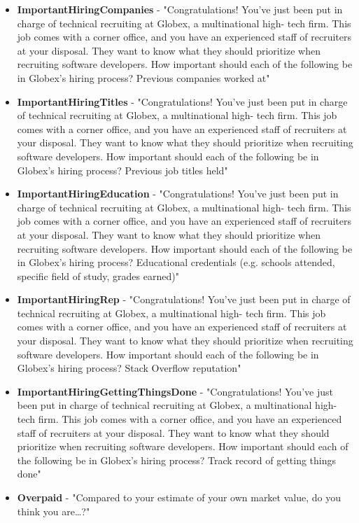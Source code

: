 \begin{appendices}
\begin{itemize}
        \item \textbf{ImportantHiringCompanies} - "Congratulations! You've just been put in charge of technical recruiting at Globex, a multinational high- tech firm. This job comes with a corner office, and you have an experienced staff of recruiters at your disposal. They want to know what they should prioritize when recruiting software developers. How important should each of the following be in Globex's hiring process? Previous companies worked at"
        \item \textbf{ImportantHiringTitles} - "Congratulations! You've just been put in charge of technical recruiting at Globex, a multinational high- tech firm. This job comes with a corner office, and you have an experienced staff of recruiters at your disposal. They want to know what they should prioritize when recruiting software developers. How important should each of the following be in Globex's hiring process? Previous job titles held"
        \item \textbf{ImportantHiringEducation} - "Congratulations! You've just been put in charge of technical recruiting at Globex, a multinational high- tech firm. This job comes with a corner office, and you have an experienced staff of recruiters at your disposal. They want to know what they should prioritize when recruiting software developers. How important should each of the following be in Globex's hiring process? Educational credentials (e.g. schools attended, specific field of study, grades earned)"
        \item \textbf{ImportantHiringRep} - "Congratulations! You've just been put in charge of technical recruiting at Globex, a multinational high- tech firm. This job comes with a corner office, and you have an experienced staff of recruiters at your disposal. They want to know what they should prioritize when recruiting software developers. How important should each of the following be in Globex's hiring process? Stack Overflow reputation"
        \item \textbf{ImportantHiringGettingThingsDone} - "Congratulations! You've just been put in charge of technical recruiting at Globex, a multinational high- tech firm. This job comes with a corner office, and you have an experienced staff of recruiters at your disposal. They want to know what they should prioritize when recruiting software developers. How important should each of the following be in Globex's hiring process? Track record of getting things done"
        \item \textbf{Overpaid} - "Compared to your estimate of your own market value, do you think you are…?"

\end{itemize}
\end{appendices}
